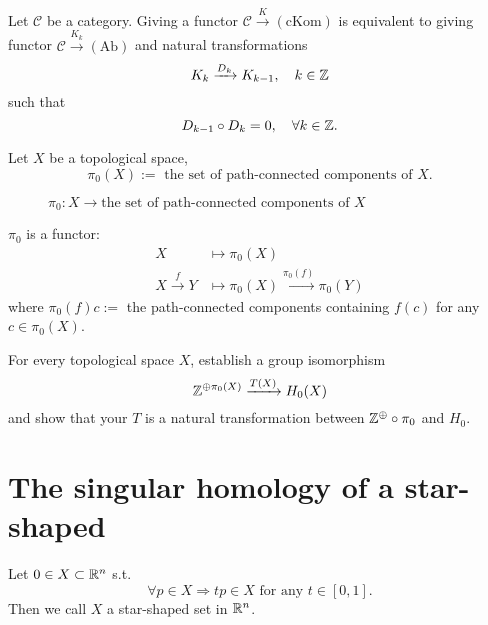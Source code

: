 Let $\mathcal{C}$ be a category. Giving a functor $\mathcal{C}\xrightarrow{K}\mathrm{(cKom)}$ is equivalent to giving functor $\mathcal{C}\xrightarrow{K_{k}}\mathrm{(Ab)}$ and natural transformations
\[
  K_k\xrightarrow{D_k}K_{k-1},\quad k\in \mathbb{Z}
\] 
such that 
\[
D_{k-1}\circ D_k=0,\quad \forall k\in \mathbb{Z}.
\] 

\begin{definition}
  Let $X$ be a topological space, 
  \[
    \pi_0(X):=\text{ the set of path-connected components of }X.
  \] 

\begin{figure}[ht]
    \centering
    \caption{$\pi_0:X\to \text{the set of path-connected components of }X$}
    \label{fig:path-connected}
\end{figure}

\end{definition}
$\pi_0$ is a functor:
\begin{equation*}
  \begin{aligned}
    X &\mapsto \pi_0(X)\\
    X\xrightarrow{f}Y&\mapsto \pi_0(X)  \xrightarrow{\pi_0(f)} \pi_0(Y)
  \end{aligned}
\end{equation*}
where $\pi_0(f)c:=$ the path-connected components containing $f(c)$ for any $c \in \pi_0(X)$.

\begin{exercise}
  For every topological space $X$, establish a group isomorphism
  \[
    \mathbb{Z} ^{\oplus \pi_0(X)}\xrightarrow{T(X)}H_0(X)
  \] 
  and show that your $T$ is a natural transformation between $\mathbb{Z}^{\oplus}\circ\pi_0$ and $H_0$.
\end{exercise}
\section{The singular homology of a star-shaped}
\begin{definition}
  Let $0\in X \subset \mathbb{R}^{n}$ s.t.
  \[
    \forall p \in X \Rightarrow tp \in X \text{ for any }t\in [0,1].
  \] 
  Then we call $X$ a star-shaped set in $\mathbb{R}^{n}$.
\end{definition}

